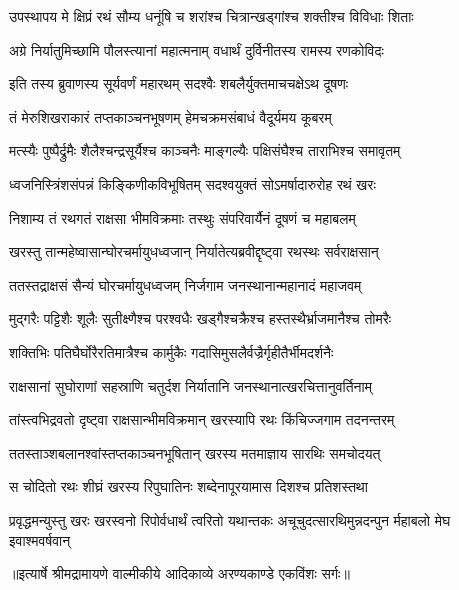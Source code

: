 \twolineshloka
{उपस्थापय मे क्षिप्रं रथं सौम्य धनूंषि च}
{शरांश्च चित्रान्खड्गांश्च शक्तीश्च विविधाः शिताः} %

\twolineshloka
{अग्रे निर्यातुमिच्छामि पौलस्त्यानां महात्मनाम्}
{वधार्थं दुर्विनीतस्य रामस्य रणकोविदः} %

\twolineshloka
{इति तस्य ब्रुवाणस्य सूर्यवर्णं महारथम्}
{सदश्वैः शबलैर्युक्तमाचचक्षेऽथ दूषणः} %

\twolineshloka
{तं मेरुशिखराकारं तप्तकाञ्चनभूषणम्}
{हेमचक्रमसंबाधं वैदूर्यमय कूबरम्} %

\twolineshloka
{मत्स्यैः पुष्पैर्द्रुमैः शैलैश्चन्द्रसूर्यैश्च काञ्चनैः}
{माङ्गल्यैः पक्षिसंघैश्च ताराभिश्च समावृतम्} %

\twolineshloka
{ध्वजनिस्त्रिंशसंपन्नं किङ्किणीकविभूषितम्}
{सदश्वयुक्तं सोऽमर्षादारुरोह रथं खरः} %

\twolineshloka
{निशाम्य तं रथगतं राक्षसा भीमविक्रमाः}
{तस्थुः संपरिवार्यैनं दूषणं च महाबलम्} %

\twolineshloka
{खरस्तु तान्महेष्वासान्घोरचर्मायुधध्वजान्}
{निर्यातेत्यब्रवीद्दृष्ट्वा रथस्थः सर्वराक्षसान्} %

\twolineshloka
{ततस्तद्राक्षसं सैन्यं घोरचर्मायुधध्वजम्}
{निर्जगाम जनस्थानान्महानादं महाजवम्} %

\twolineshloka
{मुद्गरैः पट्टिशैः शूलैः सुतीक्ष्णैश्च परश्वधैः}
{खड्गैश्चक्रैश्च हस्तस्थैर्भ्राजमानैश्च तोमरैः} %

\twolineshloka
{शक्तिभिः पतिघैर्घोरैरतिमात्रैश्च कार्मुकैः}
{गदासिमुसलैर्वज्रैर्गृहीतैर्भीमदर्शनैः} %

\twolineshloka
{राक्षसानां सुघोराणां सहस्राणि चतुर्दश}
{निर्यातानि जनस्थानात्खरचित्तानुवर्तिनाम्} %

\twolineshloka
{तांस्त्वभिद्रवतो दृष्ट्वा राक्षसान्भीमविक्रमान्}
{खरस्यापि रथः किंचिज्जगाम तदनन्तरम्} %

\twolineshloka
{ततस्ताञ्शबलानश्वांस्तप्तकाञ्चनभूषितान्}
{खरस्य मतमाज्ञाय सारथिः समचोदयत्} %

\twolineshloka
{स चोदितो रथः शीघ्रं खरस्य रिपुघातिनः}
{शब्देनापूरयामास दिशश्च प्रतिशस्तथा} %

\fourlineindentedshloka
{प्रवृद्धमन्युस्तु खरः खरस्वनो}
{ रिपोर्वधार्थं त्वरितो यथान्तकः}
{अचूचुदत्सारथिमुन्नदन्पुन}
{र्महाबलो मेघ इवाश्मवर्षवान्} %


{॥इत्यार्षे श्रीमद्रामायणे वाल्मीकीये आदिकाव्ये अरण्यकाण्डे एकविंशः सर्गः॥}

